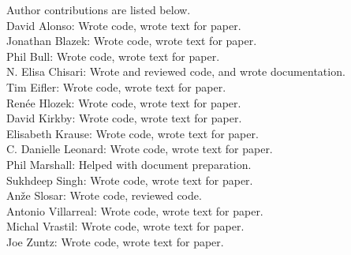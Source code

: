 Author contributions are listed below. \\
David Alonso: Wrote code, wrote text for paper. \\
Jonathan Blazek: Wrote code, wrote text for paper. \\
Phil Bull: Wrote code, wrote text for paper. \\
N. Elisa Chisari: Wrote and reviewed code, and wrote documentation.\\
Tim Eifler: Wrote code, wrote text for paper. \\
Ren\'ee Hlozek: Wrote code, wrote text for paper. \\
David Kirkby: Wrote code, wrote text for paper. \\
Elisabeth Krause: Wrote code, wrote text for paper. \\
C. Danielle Leonard: Wrote code, wrote text for paper. \\
Phil Marshall: Helped with document preparation. \\
Sukhdeep Singh: Wrote code, wrote text for paper. \\
An\v{z}e Slosar: Wrote code, reviewed code. \\
Antonio Villarreal: Wrote code, wrote text for paper. \\
Michal Vrastil: Wrote code, wrote text for paper. \\
Joe Zuntz: Wrote code, wrote text for paper. \\
